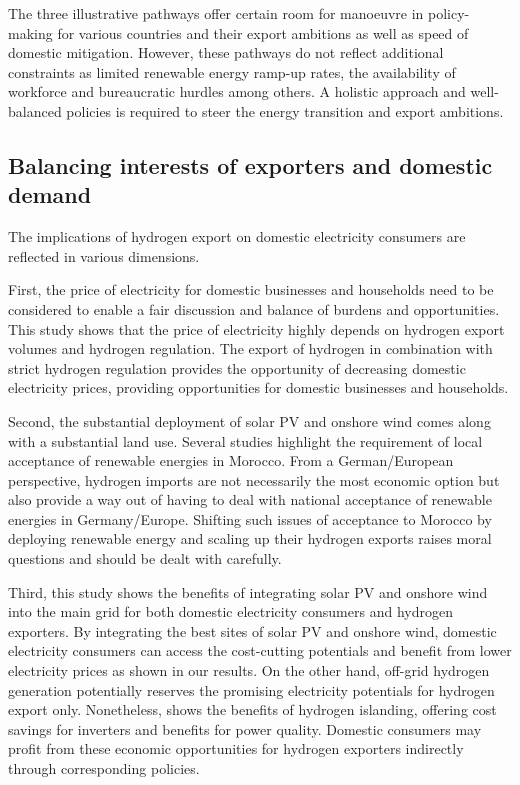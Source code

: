 The three illustrative pathways offer certain room for manoeuvre in policy-making for various countries and their export ambitions as well as speed of domestic mitigation. However, these pathways do not reflect additional constraints as limited renewable energy ramp-up rates, the availability of workforce and bureaucratic hurdles among others. A holistic approach and well-balanced policies is required to steer the energy transition and export ambitions.




\subsection*{Balancing interests of exporters and domestic demand}
\label{subsec:balancedinterests}
The implications of hydrogen export on domestic electricity consumers are reflected in various dimensions. 

First, the price of electricity for domestic businesses and households need to be considered to enable a fair discussion and balance of burdens and opportunities. This study shows that the price of electricity highly depends on hydrogen export volumes and hydrogen regulation. The export of hydrogen in combination with strict hydrogen regulation provides the opportunity of decreasing domestic electricity prices, providing opportunities for domestic businesses and households.

Second, the substantial deployment of solar PV and onshore wind comes along with a substantial land use. Several studies \cite{Terrapon-Pfaff2019, Hanger2016} highlight the requirement of local acceptance of renewable energies in Morocco. From a German/European perspective, hydrogen imports are not necessarily the most economic option \cite{Merten2023} but also provide a way out of having to deal with national acceptance of renewable energies in Germany/Europe.
Shifting such issues of acceptance to Morocco by deploying renewable energy and scaling up their hydrogen exports raises moral questions and should be dealt with carefully. %

Third, this study shows the benefits of integrating solar PV and onshore wind into the main grid for both domestic electricity consumers and hydrogen exporters. By integrating the best sites of solar PV and onshore wind, domestic electricity consumers can access the cost-cutting potentials and benefit from lower electricity prices as shown in our results. On the other hand, off-grid hydrogen generation potentially reserves the promising electricity potentials for hydrogen export only. Nonetheless, \cite{Tries2023b} shows the benefits of hydrogen islanding, offering cost savings for inverters and benefits for power quality. Domestic consumers may profit from these economic opportunities for hydrogen exporters indirectly through corresponding policies.

